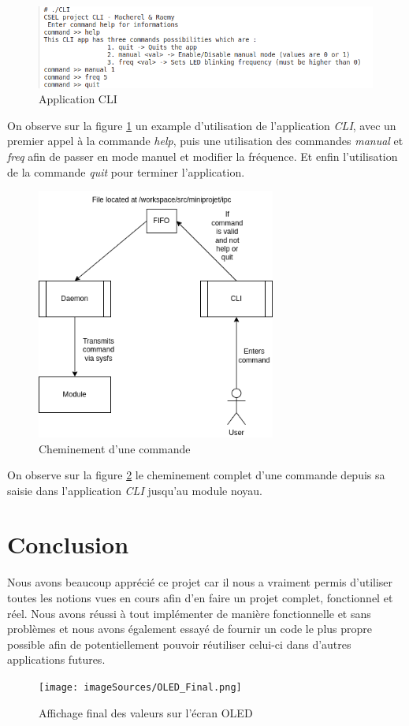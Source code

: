 \documentclass{ReportTemplate}
\begin{document}
\begin{figure}[H]
    \centering
    \includegraphics[width=\textwidth]{imageSources/Cli_Example.png}
    \caption{Application CLI}
    \label{fig:CLIApp}
\end{figure}
On observe sur la figure \ref{fig:CLIApp} un example d'utilisation de
l'application \textit{CLI}, avec un premier appel à la commande \textit{help}, puis une
utilisation des commandes \textit{manual} et \textit{freq} afin de passer en
mode manuel et modifier la fréquence. Et enfin l'utilisation de la commande
\textit{quit} pour terminer l'application.
\begin{figure}[H]
    \centering
    \includegraphics[width=0.7\textwidth]{imageSources/Cli_Command_Path.png}
    \caption{Cheminement d'une commande}
    \label{fig:CliCommandPAth}
\end{figure}
On observe sur la figure \ref{fig:CliCommandPAth} le cheminement complet d'une
commande depuis sa saisie dans l'application \textit{CLI} jusqu'au module noyau.
\chapter{Conclusion}
Nous avons beaucoup apprécié ce projet car il nous a vraiment permis d'utiliser
toutes les notions vues en cours afin d'en faire un projet complet, fonctionnel
et réel. Nous avons réussi à tout implémenter de manière fonctionnelle et sans problèmes et nous
avons également essayé de fournir un code le plus propre possible afin de
potentiellement pouvoir réutiliser celui-ci dans d'autres applications futures.
\begin{figure}[H]
    \centering
    \texttt{[image: imageSources/OLED\_Final.png]}
    \caption{Affichage final des valeurs sur l'écran OLED}
    \label{fig:OLEDFInal}
\end{figure}
\end{document}
